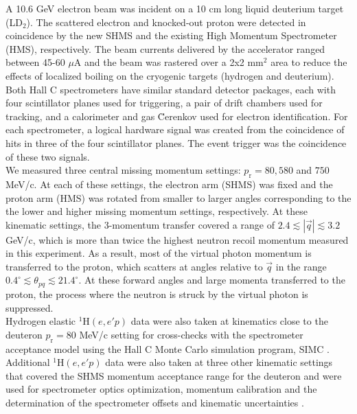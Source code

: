 \indent A 10.6 GeV electron beam was incident on a 10 cm long liquid deuterium target (LD$_{2}$). The scattered electron and knocked-out proton were detected in coincidence
by the new SHMS and the existing High Momentum Spectrometer (HMS), respectively. The beam currents delivered by the accelerator ranged between 45-60 $\mu$A and the beam was rastered over a 2x2 mm$^{2}$ area to reduce the effects of localized boiling on the cryogenic targets (hydrogen and deuterium).\\
\indent Both Hall C spectrometers have similar standard detector packages, each with four scintillator planes \cite{hodo_techreport} used for triggering, a pair of drift chambers \cite{dc_techreport} used for tracking, and a calorimeter \cite{Mkrtchyan_2013} and gas \u{C}erenkov \cite{Li_Wenliang_mthesis,ngc_techreport} used for electron identification.
For each spectrometer, a logical hardware signal was created from  the coincidence of hits in three of the four scintillator planes. The event trigger was the coincidence of these two signals. \\
\indent We measured three central missing momentum settings: $p_{\mathrm{r}}=80, 580$ and $750$ MeV/c. At each of these settings, the electron arm (SHMS) was fixed and the proton arm (HMS) was rotated from smaller to larger angles corresponding to the
the lower and higher missing momentum settings, respectively. At these kinematic settings, the 3-momentum transfer covered a range of $2.4\lesssim|\vec{q}|\lesssim3.2$ GeV/c, which is more than twice the highest neutron recoil momentum
measured in this experiment. As a result, most of the virtual photon momentum is transferred to the proton, which scatters at angles relative to $\vec{q}$ in the range $0.4^{\circ}\lesssim \theta_{pq}\lesssim21.4^{\circ}$.
At these forward angles and large momenta transferred to the proton, the  process where the neutron is struck by the virtual photon is suppressed.\\
\indent Hydrogen elastic $^{1}\mathrm{H}(e,e'p)$ data were also taken at kinematics close to the deuteron $p_{\mathrm{r}}=80$ MeV/c setting for cross-checks with the spectrometer acceptance model using the  Hall C Monte Carlo
simulation program, SIMC \cite{PhysRevC.64.054610}. Additional $^{1}\mathrm{H}(e,e'p)$ data were also taken at three other kinematic settings that covered the SHMS momentum acceptance range for the deuteron and were used for spectrometer optics optimization, 
momentum calibration and the determination of the spectrometer offsets and kinematic uncertainties \cite{cyero_phdthesis}.\\
